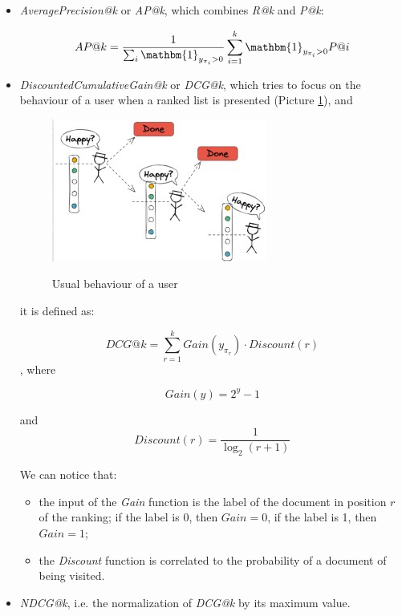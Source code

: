 \begin{itemize}
    \item \textit{AveragePrecision@k} or \textit{AP@k}, which combines \textit{R@k} and \textit{P@k}:

    $$
    AP@k = \frac{1}{\sum_i \mathbm{1}_{y_{\pi_i} > 0}} \sum \limits_{i = 1}^k \mathbm{1}_{y_{\pi_i} > 0} P@i
    $$

    \item \textit{DiscountedCumulativeGain@k} or \textit{DCG@k}, which tries to focus on the behaviour of a user when a ranked list is presented (Picture \ref{dcg}), and

    \begin{figure}[h!]
		\centering
		\includegraphics[scale = 2.0]{img/dcg.jpg}
        \label{dcg}
        \caption{Usual behaviour of a user}
    \end{figure}
    
    it is defined as:

    $$
    DCG@k = \sum_{r = 1}^k Gain(y_{\pi_r}) \cdot Discount(r)
    $$
    , where 

    $$
    Gain(y) = 2^y - 1
    $$

    and 
    $$
    Discount(r) = \frac{1}{\log_2(r+1)}
    $$

    We can notice that:

    \begin{itemize}
        \item the input of the \textit{Gain} function is the label of the document in position $r$ of the ranking; if the label is 0, then $Gain = 0$, if the label is 1, then $Gain = 1$;
        \item the \textit{Discount} function is correlated to the probability of a document of being visited.
    \end{itemize}

    \item \textit{NDCG@k}, i.e. the normalization of \textit{DCG@k} by its maximum value.
    
\end{itemize}

